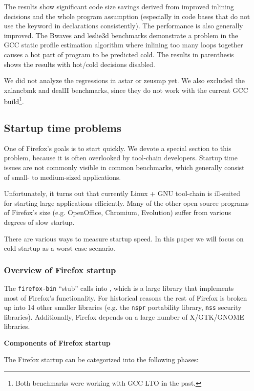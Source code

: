 \documentclass[final]{ols}
\begin{document}
The results show significant code size savings derived from improved
inlining decisions and the whole program assumption (especially in code bases that
do not use the  keyword in declarations consistently).  The
performance is also generally improved.  The  Bwaves and leslie3d benchmarks
demonstrate a problem in the GCC static profile estimation algorithm where
inlining too many loops together causes a hot part of program to be predicted
cold.  The results in parenthesis shows the results with hot/cold decisions
disabled.

We did not analyze the regressions in astar or zeusmp yet. We also excluded the
xalancbmk and dealII benchmarks, since they do not work with the current GCC
build\footnote{Both benchmarks were working with GCC LTO in the past.}.

\subsection{Startup time problems}
\label{startuptime}
One of Firefox's goals is to start quickly. We devote a special section to this
problem, because it is often overlooked by tool-chain developers. 
Startup time issues are not commonly visible in common benchmarks, which generally
consist of small- to medium-sized applications.

Unfortunately, it turns out that currently Linux + GNU tool-chain is ill-suited
for starting large applications efficiently. Many of the other open source
programs of Firefox's size (e.g. OpenOffice, Chromium, Evolution) suffer
from various degrees of slow startup.

There are various ways to measure startup speed. In this paper we will focus on
cold startup as a worst-case scenario.

\subsubsection{Overview of Firefox startup}

The {\tt firefox-bin} ``stub'' calls into , which is a large library that
implements most of Firefox's functionality. For historical reasons the rest of
Firefox is broken up into 14 other smaller libraries (e.g. the {\tt nspr} portability
library, {\tt nss} security libraries). Additionally, Firefox depends on a large
number of X/GTK/GNOME libraries.

{\bf Components of Firefox startup}

The Firefox startup can be categorized into the following phases:
\end{document}
